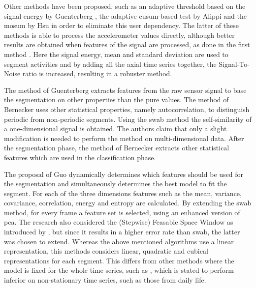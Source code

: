Other methods have been proposed, such as an adaptive threshold based on the signal energy by Guenterberg \etal \cite{guenterberg2009automatic}, the adaptive \gls{cusum}-based test by Alippi \etal \cite{alippi2006adaptive} and the \gls{mosum} by Hsu \cite{hsu2007mosum} in order to eliminate this user dependency.
The latter of these methods is able to process the accelerometer values directly, although better results are obtained when features of the signal are processed, as done in the first method \cite{guenterberg2009automatic}.
Here the signal energy, mean and standard deviation are used to segment activities and by adding all the axial time series together, the Signal-To-Noise ratio is increased, resulting in a robuster method.

The method of Guenterberg \etal \cite{guenterberg2009automatic} extracts features from the raw sensor signal to base the segmentation on other properties than the pure values.
The method of Bernecker \etal \cite{bernecker2012activity} uses other statistical properties, namely autocorrelation, to distinguish periodic from non-periodic segments.
Using the \gls{swab} method the self-similarity of a one-dimensional signal is obtained.
The authors claim that only a slight modification is needed to perform the method on multi-dimensional data.
After the segmentation phase, the method of Bernecker \etal \cite{bernecker2012activity} extracts other statistical features which are used in the classification phase.

The proposal of Guo \etal \cite{guo2012adaptive} dynamically determines which features should be used for the segmentation and simultaneously determines the best model to fit the segment.
For each of the three dimensions features such as the mean, variance, covariance, correlation, energy and entropy are calculated.
By extending the \gls{swab} method, for every frame a feature set is selected, using an enhanced version of \gls{pca}.
The research also considered the (Stepwise) Feasable Space Window as introduced by \cite{liu2008novel}, but since it results in a higher error rate than \gls{swab}, the latter was chosen to extend.
Whereas the above mentioned algorithms use a linear representation, this methods considers linear, quadratic and cubical representations for each segment.
This differs from other methods where the model is fixed for the whole time series, such as \cite{fuchs2010online}, which is stated to perform inferior on non-stationary time series, such as those from daily life.

